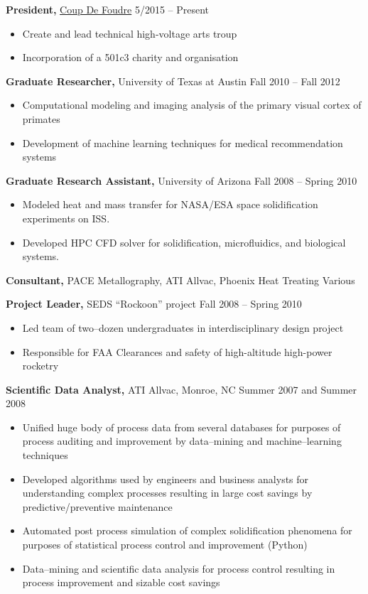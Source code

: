 \documentclass{res}
\begin{document}
\begin{resume}
{\bf President,}  \href{http://coupdefoud.re}{Coup De Foudre} \hfill   5/2015 -- Present
\begin{itemize} \itemsep -2pt
  \item Create and lead technical high-voltage arts troup
  \item Incorporation of a 501c3 charity and organisation
\end{itemize}


{\bf Graduate Researcher,} University of Texas at Austin \hfill
Fall 2010 -- Fall 2012
\begin{itemize} \itemsep -2pt
  \item Computational modeling and imaging analysis of the primary visual cortex of primates
  \item Development of machine learning techniques for medical recommendation systems
\end{itemize}

{\bf Graduate Research Assistant,} University of Arizona \hfill
Fall 2008 -- Spring 2010
\begin{itemize} \itemsep -2pt
  \item Modeled heat and mass transfer for NASA/ESA space solidification experiments on ISS.
  \item Developed HPC CFD solver for solidification, microfluidics, and biological systems.
\end{itemize}

{\bf Consultant,} PACE Metallography, ATI Allvac, Phoenix Heat Treating \hfill Various

{\bf Project Leader,}  SEDS ``Rockoon''  project \hfill   Fall 2008 -- Spring 2010
\begin{itemize} \itemsep -2pt
  \item Led team of two--dozen undergraduates in interdisciplinary design project
  \item Responsible for FAA Clearances and safety of high-altitude high-power rocketry
\end{itemize}

{\bf Scientific Data Analyst,} ATI Allvac, Monroe, NC \hfill
Summer 2007 and Summer 2008
\begin{itemize} \itemsep -2pt
  \item Unified huge body of process data from several databases for purposes of
    process auditing and improvement by data--mining and machine--learning techniques
  \item Developed algorithms used by engineers and business analysts for understanding
    complex processes resulting in large cost savings by predictive/preventive maintenance
  \item Automated post process
    simulation of complex solidification phenomena for purposes of
    statistical process control and improvement (Python)
  \item Data--mining and scientific data analysis for process control resulting
    in process improvement and sizable cost savings
\end{itemize}


\end{resume}
\end{document}
